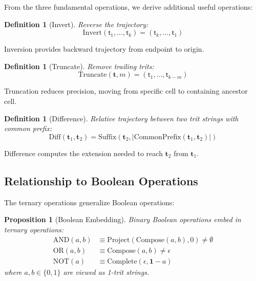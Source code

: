 \documentclass[twocolumn,10pt]{article}
\newtheorem{definition}[theorem]{Definition}
\newtheorem{proposition}[theorem]{Proposition}
\theoremstyle{remark}
\newcommand{\tmark}{\mathsf{t}}
\begin{document}
From the three fundamental operations, we derive additional useful operations:

\begin{definition}[Invert]
Reverse the trajectory:
\begin{equation}
\text{Invert}(\tmark_1, \ldots, \tmark_k) = (\tmark_k, \ldots, \tmark_1)
\end{equation}
\end{definition}

Inversion provides backward trajectory from endpoint to origin.

\begin{definition}[Truncate]
Remove trailing trits:
\begin{equation}
\text{Truncate}(\mathbf{t}, m) = (\tmark_1, \ldots, \tmark_{k-m})
\end{equation}
\end{definition}

Truncation reduces precision, moving from specific cell to containing ancestor cell.

\begin{definition}[Difference]
Relative trajectory between two trit strings with common prefix:
\begin{equation}
\text{Diff}(\mathbf{t}_1, \mathbf{t}_2) = \text{Suffix}(\mathbf{t}_2, |\text{CommonPrefix}(\mathbf{t}_1, \mathbf{t}_2)|)
\end{equation}
\end{definition}

Difference computes the extension needed to reach $\mathbf{t}_2$ from $\mathbf{t}_1$.

\subsection{Relationship to Boolean Operations}

The ternary operations generalize Boolean operations:

\begin{proposition}[Boolean Embedding]
Binary Boolean operations embed in ternary operations:
\begin{align}
\text{AND}(a, b) &\equiv \text{Project}(\text{Compose}(a, b), 0) \neq \emptyset \\
\text{OR}(a, b) &\equiv \text{Compose}(a, b) \neq \epsilon \\
\text{NOT}(a) &\equiv \text{Complete}(\epsilon, \mathbf{1} - a)
\end{align}
where $a, b \in \{0, 1\}$ are viewed as 1-trit strings.
\end{proposition}
\end{document}
